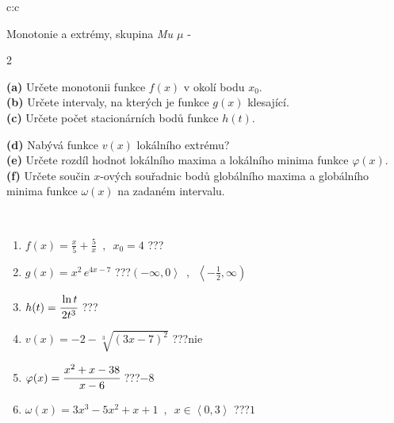 \documentclass[10pt]{report}
\begin{document}
\newpage
\thispagestyle{empty}
\begin{tabular}{c:c}
\begin{minipage}[c][104.5mm][t]{0.5\linewidth}
\begin{center}
\vspace{7mm}
{\huge Monotonie a extrémy, skupina \textit{Mu $\mu$} -}\\[5mm]
\begin{minipage}{0.95\linewidth}
\begin{center}
{\small \begin{multicols}{2} \raggedright
\textbf{(a)} Určete monotonii funkce \(f(x)\) v okolí bodu \(x_0\). \\[1mm]
\textbf{(b)} Určete intervaly, na kterých je funkce \(g(x)\) klesající. \\[1mm]
\textbf{(c)} Určete počet stacionárních bodů funkce \(h(t)\). \par \columnbreak
\textbf{(d)} Nabývá funkce \(v(x)\) lokálního extrému? \\[1mm]
\textbf{(e)} Určete rozdíl hodnot lokálního maxima a lokálního minima funkce \(\varphi(x)\). \\[1mm]
\textbf{(f)} Určete součin \(x\)-ových souřadnic bodů globálního maxima a globálního minima funkce \(\omega(x)\) na zadaném intervalu. \\[1mm]
\end{multicols}
}
\end{center}
\end{minipage}
\\[4mm]
\begin{minipage}{0.79\linewidth}
\begin{center}
\begin{varwidth}{\linewidth}
\begin{enumerate}
\normalsize
\item $f(x)=\frac{x}{5}+\frac{5}{x} \enspace , \enspace x_0=4$\quad \dotfill\; ???\;\dotfill \quad {}
\item $g(x)=x^2\, e^{4x-7}$\quad \dotfill\; ???\;\dotfill \quad $\left(-\infty , 0\right\rangle\enspace , \enspace \left\langle-\frac{1}{2} , \infty\right)$
\item $h(t)=\cfrac{\ln t}{2t^3}$\quad \dotfill\; ???\;\dotfill {}
\item $v(x)=-2-\sqrt[3]{(3x-7)^2}$\quad \dotfill\; ???\;\dotfill \quad $\text{nie}$
\item $\varphi(x)=\cfrac{x^2+x-38}{x-6}$\quad \dotfill\; ???\;\dotfill \quad $-8$
\item $\omega(x)=3x^3-5x^2+x+1 \enspace , \enspace x\in\left\langle0 , 3\right\rangle$\quad \dotfill\; ???\;\dotfill \quad $1$

\end{enumerate}
\end{varwidth}
\end{center}
\end{minipage}
\end{center}
\end{minipage}
\end{tabular}
\end{document}
